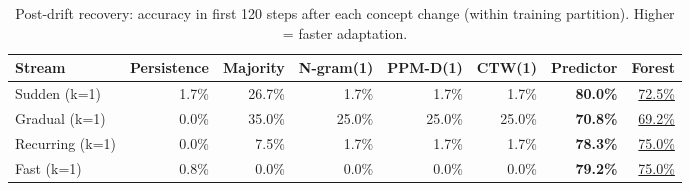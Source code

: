 \begin{table}[h]
\centering
\caption{Post-drift recovery: accuracy in first 120 steps after each concept change (within training partition). Higher = faster adaptation.}
\label{tab:postdrift}
\begin{tabular}{lrrrrrrr}
\toprule
Stream & Persistence & Majority & N-gram(1) & PPM-D(1) & CTW(1) & Predictor & Forest \\
\midrule
Sudden (k=1) & 1.7\% & 26.7\% & 1.7\% & 1.7\% & 1.7\% & \textbf{80.0\%} & \underline{72.5\%} \\
Gradual (k=1) & 0.0\% & 35.0\% & 25.0\% & 25.0\% & 25.0\% & \textbf{70.8\%} & \underline{69.2\%} \\
Recurring (k=1) & 0.0\% & 7.5\% & 1.7\% & 1.7\% & 1.7\% & \textbf{78.3\%} & \underline{75.0\%} \\
Fast (k=1) & 0.8\% & 0.0\% & 0.0\% & 0.0\% & 0.0\% & \textbf{79.2\%} & \underline{75.0\%} \\
\bottomrule
\end{tabular}
\end{table}

